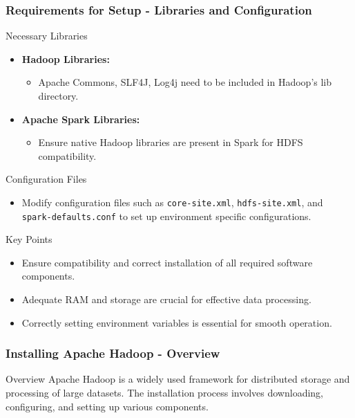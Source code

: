 \documentclass{beamer}
\begin{document}
\begin{frame}[fragile]
    \frametitle{Requirements for Setup - Libraries and Configuration}
    \begin{block}{Necessary Libraries}
        \begin{itemize}
            \item \textbf{Hadoop Libraries:}
            \begin{itemize}
                \item Apache Commons, SLF4J, Log4j need to be included in Hadoop's lib directory.
            \end{itemize}
            \item \textbf{Apache Spark Libraries:}
            \begin{itemize}
                \item Ensure native Hadoop libraries are present in Spark for HDFS compatibility.
            \end{itemize}
        \end{itemize}
    \end{block}

    \begin{block}{Configuration Files}
        \begin{itemize}
            \item Modify configuration files such as \texttt{core-site.xml}, \texttt{hdfs-site.xml}, and \texttt{spark-defaults.conf} to set up environment specific configurations.
        \end{itemize}
    \end{block}

    \begin{block}{Key Points}
        \begin{itemize}
            \item Ensure compatibility and correct installation of all required software components.
            \item Adequate RAM and storage are crucial for effective data processing.
            \item Correctly setting environment variables is essential for smooth operation.
        \end{itemize}
    \end{block}
\end{frame}

\begin{frame}[fragile]
    \frametitle{Installing Apache Hadoop - Overview}
    \begin{block}{Overview}
        Apache Hadoop is a widely used framework for distributed storage and processing of large datasets. 
        The installation process involves downloading, configuring, and setting up various components.
    \end{block}
\end{frame}
\end{document}
